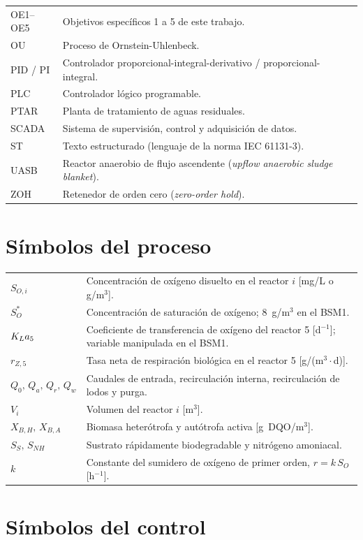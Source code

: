 \begin{longtable}{p{2.6cm}p{12.5cm}}
OE1--OE5 & Objetivos específicos 1 a 5 de este trabajo. \\
OU & Proceso de Ornstein-Uhlenbeck. \\
PID / PI & Controlador proporcional-integral-derivativo / proporcional-integral. \\
PLC & Controlador lógico programable. \\
PTAR & Planta de tratamiento de aguas residuales. \\
SCADA & Sistema de supervisión, control y adquisición de datos. \\
ST & Texto estructurado (lenguaje de la norma IEC 61131-3). \\
UASB & Reactor anaerobio de flujo ascendente (\textit{upflow anaerobic sludge blanket}). \\
ZOH & Retenedor de orden cero (\textit{zero-order hold}). \\
\end{longtable}

\section*{Símbolos del proceso}

\begin{longtable}{p{2.6cm}p{12.5cm}}
$S_{O,i}$ & Concentración de oxígeno disuelto en el reactor $i$ [mg/L o g/m$^3$]. \\
$S_O^{*}$ & Concentración de saturación de oxígeno; 8~g/m$^3$ en el BSM1. \\
$K_{L}a_{5}$ & Coeficiente de transferencia de oxígeno del reactor 5 [d$^{-1}$]; variable manipulada en el BSM1. \\
$r_{Z,5}$ & Tasa neta de respiración biológica en el reactor 5 [g/(m$^3\cdot$d)]. \\
$Q_0,\,Q_a,\,Q_r,\,Q_w$ & Caudales de entrada, recirculación interna, recirculación de lodos y purga. \\
$V_i$ & Volumen del reactor $i$ [m$^3$]. \\
$X_{B,H},\,X_{B,A}$ & Biomasa heterótrofa y autótrofa activa [g~DQO/m$^3$]. \\
$S_S,\,S_{NH}$ & Sustrato rápidamente biodegradable y nitrógeno amoniacal. \\
$k$ & Constante del sumidero de oxígeno de primer orden, $r = k\,S_O$ [h$^{-1}$]. \\
\end{longtable}

\section*{Símbolos del control}

